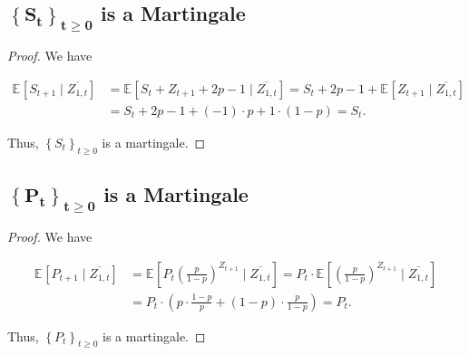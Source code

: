 \documentclass{article}
\newcommand{\set}[1]{\left\{#1\right\}}
\newcommand{\staExp}[2]{\mathbb{E}_{#1}\left[#2\right]}
\begin{document}
\subsection{$\boldsymbol{\set{S_t}_{t\geq 0}}$ is a Martingale}
\vspace{1em}
\begin{proof}
    We have
    
    \vspace{-2.5em}
    \begin{align*}
        \staExp{}{S_{t+1}\mid\overline{Z_{1,t}}} & = \staExp{}{S_t+Z_{t+1}+2p-1\mid\overline{Z_{1,t}}} = S_t+2p-1+\staExp{}{Z_{t+1}\mid\overline{Z_{1,t}}} \\
        & = S_t+2p-1+(-1)\cdot p + 1\cdot(1-p) = S_t.
    \end{align*}
    
    \hspace{1.3em}
    Thus, $\set{S_t}_{t\geq0}$ is a martingale.
\end{proof}

\vspace{3em}
\subsection{$\boldsymbol{\set{P_t}_{t\geq0}}$ is a Martingale}
\vspace{1em}
\begin{proof}
    We have
        
    \vspace{-2em}
    \begin{align*}
        \staExp{}{P_{t+1}\mid\overline{Z_{1,t}}} & = \staExp{}{P_t\left(\frac{p}{1-p}\right)^{Z_{t+1}} \mid \overline{Z_{1,t}}} = P_t\cdot\staExp{}{\left(\frac{p}{1-p}\right)^{Z_{t+1}}\mid\overline{Z_{1,t}}} \\
        & = P_t\cdot\left(p\cdot\frac{1-p}{p}+(1-p)\cdot\frac{p}{1-p}\right) = P_t.
    \end{align*}
    
    \vspace{-0.25em} \hspace{1.3em}
    Thus, $\set{P_t}_{t\geq0}$ is a martingale.
\end{proof}

\vspace{3em}
\end{document}
